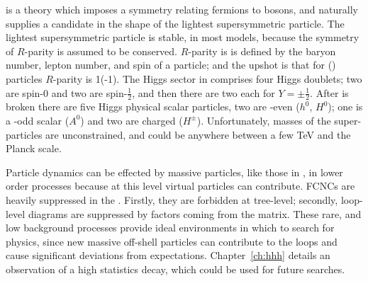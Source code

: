 \SUSY is a theory which imposes a symmetry relating fermions to bosons, and naturally supplies a
\dm candidate in the shape of the lightest supersymmetric
particle.%
The lightest supersymmetric particle is stable, in most models, because the symmetry of $R$-parity
is assumed to be conserved.
$R$-parity is is defined by the baryon number, lepton number, and spin of a particle; and the
upshot is that for \sm(\susy) particles $R$-parity is 1(-1).
The Higgs sector in \SUSY comprises four Higgs doublets; two are spin-0 and two are spin-$\tfrac12$,
and then there are two each for $Y=\pm\tfrac12$.
After \SUSY is broken there are five Higgs physical scalar particles, two are \CP-even ($h^0$,
$H^0$); one is a \CP-odd scalar ($A^0$) and two are charged ($H^\pm$).
Unfortunately, masses of the super-particles are unconstrained, and could be anywhere between a few
TeV and the Planck scale.


Particle dynamics can be effected by massive \np particles, like those in \SUSY, in lower order
processes because at this level virtual particles can contribute.
\glspl{FCNC} are heavily suppressed in the \sm.
Firstly, they are forbidden at tree-level; secondly, loop-level diagrams are suppressed by factors
coming from the \ckm matrix.
These rare, and low background processes provide ideal environments in which to search for \bsm
physics, since new massive off-shell particles can contribute to the loops and cause significant
deviations from \sm expectations.
Chapter~\ref{ch:hhh} details an observation of a high statistics \fcnc decay,
which could be used for future \np searches.





